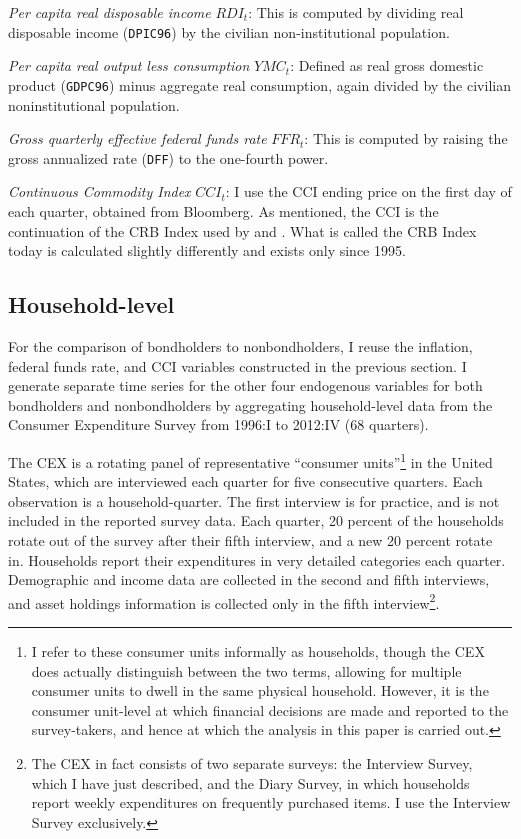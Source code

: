 \textit{Per capita real disposable income} $RDI_t$: This is computed by dividing real disposable income (\texttt{DPIC96}) by the civilian non-institutional population.

\textit{Per capita real output less consumption} $YMC_t$: Defined as real gross domestic product (\texttt{GDPC96}) minus aggregate real consumption, again divided by the civilian noninstitutional population.

\textit{Gross quarterly effective federal funds rate} $FFR_t$: This is computed by raising the gross annualized rate (\texttt{DFF}) to the one-fourth power.

\textit{Continuous Commodity Index} $CCI_t$: I use the CCI ending price on the first day of each quarter, obtained from Bloomberg. As mentioned, the CCI is the continuation of the CRB Index used by \cite{canzoneri07} and \cite{collard11}. What is called the CRB Index today is calculated slightly differently and exists only since 1995.



\subsection{Household-level}
For the comparison of bondholders to nonbondholders, I reuse the inflation, federal funds rate, and CCI variables constructed in the previous section. I generate separate time series for the other four endogenous variables for both bondholders and nonbondholders by aggregating household-level data from the Consumer Expenditure Survey from 1996:I to 2012:IV (68 quarters).

The CEX is a rotating panel of representative ``consumer units''\footnote{I refer to these consumer units informally as households, though the CEX does actually distinguish between the two terms, allowing for multiple consumer units to dwell in the same physical household. However, it is the consumer unit-level at which financial decisions are made and reported to the survey-takers, and hence at which the analysis in this paper is carried out.} in the United States, which are interviewed each quarter for five consecutive quarters. Each observation is a household-quarter. The first interview is for practice, and is not included in the reported survey data. Each quarter, 20 percent of the households rotate out of the survey after their fifth interview, and a new 20 percent rotate in. Households report their expenditures in very detailed categories each quarter. Demographic and income data are collected in the second and fifth interviews, and asset holdings information is collected only in the fifth interview\footnote{The CEX in fact consists of two separate surveys: the Interview Survey, which I have just described, and the Diary Survey, in which households report weekly expenditures on frequently purchased items. I use the Interview Survey exclusively.}.

